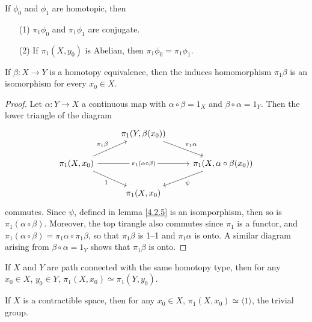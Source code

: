 \begin{corollary}
    If $\phi_0$ and $\phi_1$ are homotopic, then
    \begin{enumerate}
        \item[(1)] $\pi_1{\phi_0}$ and $\pi_1{\phi_1}$ are conjugate.

            \item[(2)] If $\pi_1(X,y_0)$ is Abelian, then
                $\pi_1{\phi_0}=\pi_1{\phi_1}$.
    \end{enumerate}
\end{corollary}

\begin{theorem}\label{4.2.6}
    If $\beta:X \xrightarrow{} Y$ is a homotopy equivalence, then the induces
    homomorphism $\pi_1{\beta}$ is an isomorphism for every $x_0 \in X$.
\end{theorem}
\begin{proof}
    Let $\alpha:Y \xrightarrow{} X$ a continuous map with $\alpha \circ
    \beta=1_X$ and  $\beta \circ \alpha=1_Y$. Then the lower triangle of the
    diagram
    \[\begin{tikzcd}
        & {\pi_1(Y,\beta(x_0))} \\
        {\pi_1(X,x_0)} && {\pi_1(X,\alpha \circ \beta(x_0))} \\
        & {\pi_1(X,x_0)}
        \arrow["{\pi_1{\beta}}", from=2-1, to=1-2]
        \arrow["{\pi_1{\alpha}}", from=1-2, to=2-3]
        \arrow["\psi", from=2-3, to=3-2]
        \arrow["1"', from=2-1, to=3-2]
        \arrow["{\pi_1{(\alpha \circ \beta)}}"{description}, from=2-1, to=2-3]
    \end{tikzcd}\]
    commutes. Since $\psi$, defined in lemma \ref{4.2.5} is an isomporphism,
    then so is $\pi_1{(\alpha \circ \beta)}$. Moreover, the top tirangle also
    commutes since $\pi_1$ is a functor, and $\pi_1{(\alpha \circ
    \beta)}=\pi_1{\alpha} \circ \pi_1{\beta}$, so that $\pi_1{\beta}$ is 1--1
    and $\pi_1{\alpha}$ is onto. A similar diagram arising from $\beta \circ
    \alpha=1_Y$ shows that  $\pi_1{\beta}$ is onto.
\end{proof}
\begin{corollary}
    If $X$ and  $Y$ are path connected with the same homotopy type, then for any
     $x_0 \in X$, $y_0 \in Y$, $\pi_1{(X,x_0)} \simeq \pi_1(Y,y_0)$.
\end{corollary}
\begin{corollary}
    If $X$ is a contractible space, then for any  $x_0 \in X$, $\pi_1(X,x_0)
    \simeq \langle 1 \rangle$, the trivial group.
\end{corollary}
